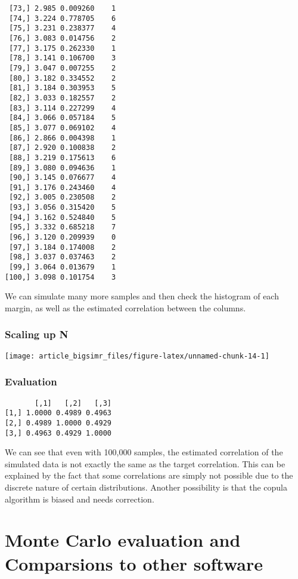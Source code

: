 \documentclass[
]{article}
\begin{document}
\begin{verbatim}
 [73,] 2.985 0.009260    1
 [74,] 3.224 0.778705    6
 [75,] 3.231 0.238377    4
 [76,] 3.083 0.014756    2
 [77,] 3.175 0.262330    1
 [78,] 3.141 0.106700    3
 [79,] 3.047 0.007255    2
 [80,] 3.182 0.334552    2
 [81,] 3.184 0.303953    5
 [82,] 3.033 0.182557    2
 [83,] 3.114 0.227299    4
 [84,] 3.066 0.057184    5
 [85,] 3.077 0.069102    4
 [86,] 2.866 0.004398    1
 [87,] 2.920 0.100838    2
 [88,] 3.219 0.175613    6
 [89,] 3.080 0.094636    1
 [90,] 3.145 0.076677    4
 [91,] 3.176 0.243460    4
 [92,] 3.005 0.230508    2
 [93,] 3.056 0.315420    5
 [94,] 3.162 0.524840    5
 [95,] 3.332 0.685218    7
 [96,] 3.120 0.209939    0
 [97,] 3.184 0.174008    2
 [98,] 3.037 0.037463    2
 [99,] 3.064 0.013679    1
[100,] 3.098 0.101754    3
\end{verbatim}

We can simulate many more samples and then check the histogram of each margin, as well as the estimated correlation between the columns.

\hypertarget{scaling-up-n}{%
\subsubsection{Scaling up N}\label{scaling-up-n}}

\begin{center}\texttt{[image: article\_bigsimr\_files/figure-latex/unnamed-chunk-14-1]} \end{center}

\hypertarget{evaluation}{%
\subsubsection{Evaluation}\label{evaluation}}

\begin{verbatim}
       [,1]   [,2]   [,3]
[1,] 1.0000 0.4989 0.4963
[2,] 0.4989 1.0000 0.4929
[3,] 0.4963 0.4929 1.0000
\end{verbatim}

We can see that even with 100,000 samples, the estimated correlation of the simulated data is not exactly the same as the target correlation. This can be explained by the fact that some correlations are simply not possible due to the discrete nature of certain distributions. Another possibility is that the copula algorithm is biased and needs correction.

\hypertarget{monte-carlo-evaluation-and-comparsions-to-other-software}{%
\section{Monte Carlo evaluation and Comparsions to other software}\label{monte-carlo-evaluation-and-comparsions-to-other-software}}
\end{document}
